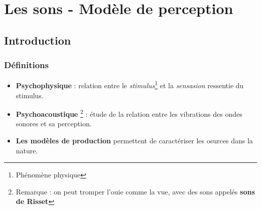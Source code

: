 \chapter{Les sons - Modèle de perception}
\section{Introduction}
\subsection{Définitions}
\begin{itemize}
    \item \textbf{Psychophysique} : relation entre le \textit{stimulus}\footnote{Phénomène physique} et la \textit{sensasion} ressentie du stimulus. \newline
    \item \textbf{Psychoacoustique} \footnote{Remarque : on peut tromper l'ouie comme la vue, avec des sons appelés \textbf{sons de Risset}} : étude de la relation entre les vibrations des ondes sonores et sa perception.\newline
    \item \textbf{Les modèles de production} permettent de caractériser les osurces dans la nature.
\end{itemize}
